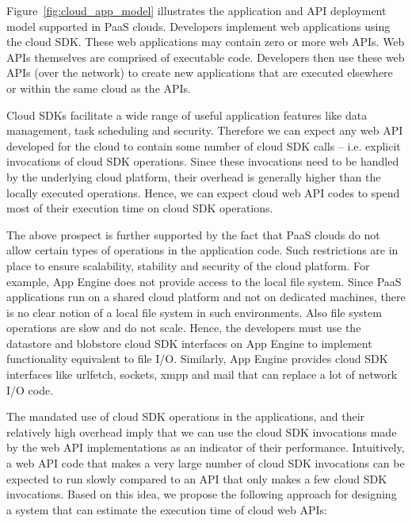 Figure~\ref{fig:cloud_app_model} illustrates the application and API deployment model supported in PaaS clouds.
Developers implement web applications using the cloud SDK. These web applications may contain zero or more
web APIs. Web APIs themselves are comprised of executable code. 
Developers then use these web APIs (over the network) to create new applications that are executed elsewhere or within the
same cloud as the APIs.

Cloud SDKs facilitate a wide range of useful application features like data management, 
task scheduling and security. Therefore we can expect any web API developed for the cloud to
contain some number of cloud SDK calls -- i.e.
explicit invocations of cloud SDK operations. Since these invocations need to be handled by the
underlying cloud platform, their overhead is generally higher than the locally executed operations.
Hence, we can expect cloud web API codes to spend most of their execution time on cloud SDK operations. 

The above prospect is further supported by the fact that PaaS clouds do not allow 
certain types of operations in the application code. Such restrictions are in place
to ensure scalability, stability and security of the cloud platform. For example, App Engine
does not provide access to the local file system. Since PaaS applications run on a shared cloud
platform and not on dedicated machines, there is no clear notion of a local file system in such environments.
Also file system operations are slow and do not scale.
Hence, the developers must use the datastore and blobstore cloud SDK interfaces on App
Engine to implement functionality equivalent to file I/O. Similarly, App Engine provides cloud SDK
interfaces like urlfetch, sockets, xmpp and mail that can replace a lot of network I/O code.

The mandated use of cloud SDK operations in the applications, and their relatively high overhead 
imply that we can use the cloud SDK
invocations made by the web API implementations as an indicator of their performance. Intuitively, a web API
code that makes a very large number of cloud SDK invocations can be expected to run slowly compared
to an API that only makes a few cloud SDK invocations. Based on this idea, we propose the following approach
for designing a system that can estimate the execution time of cloud web APIs:

